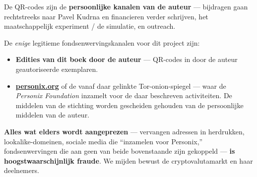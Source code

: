 \begin{minipage}[t]{0.60\textwidth}
\vspace{0pt}
\begin{mdframed}[
  linewidth=0.7pt,roundcorner=5pt,
  innerleftmargin=10pt,innerrightmargin=10pt,
  innertopmargin=8pt,innerbottommargin=8pt,
  skipabove=0pt,skipbelow=0pt,
  linecolor=cbwarning!50,backgroundcolor=cbwarning!5,
  nobreak=true,
  needspace=4\baselineskip,
]
\footnotesize
De QR-codes zijn de \textbf{persoonlijke kanalen van de auteur} --- bijdragen gaan rechtstreeks naar Pavel Kudrna en financieren verder schrijven, het maatschappelijk experiment / de simulatie, en outreach.

\smallskip
De \emph{enige} legitieme fondsenwervingskanalen voor dit project zijn:

\smallskip
\begin{itemize}
\setlength{\itemsep}{0pt}
\setlength{\topsep}{0pt}
\item \textbf{Edities van dit boek door de auteur} --- QR-codes in door de auteur geautoriseerde exemplaren.
\item \href{https://personix.org}{\textbf{personix.org}} of de vanaf daar gelinkte Tor-onion-spiegel --- waar de \emph{Personix Foundation} inzamelt voor de daar beschreven activiteiten. De middelen van de stichting worden gescheiden gehouden van de persoonlijke middelen van de auteur.
\end{itemize}

\smallskip
\textbf{Alles wat elders wordt aangeprezen} --- vervangen adressen in herdrukken, lookalike-domeinen, sociale media die ``inzamelen voor Personix,'' fondsenwervingen die aan geen van beide bovenstaande zijn gekoppeld --- \textbf{is hoogstwaarschijnlijk fraude}. We mijden bewust de cryptovalutamarkt en haar deelnemers.
\end{mdframed}
\end{minipage}

\clearpage
